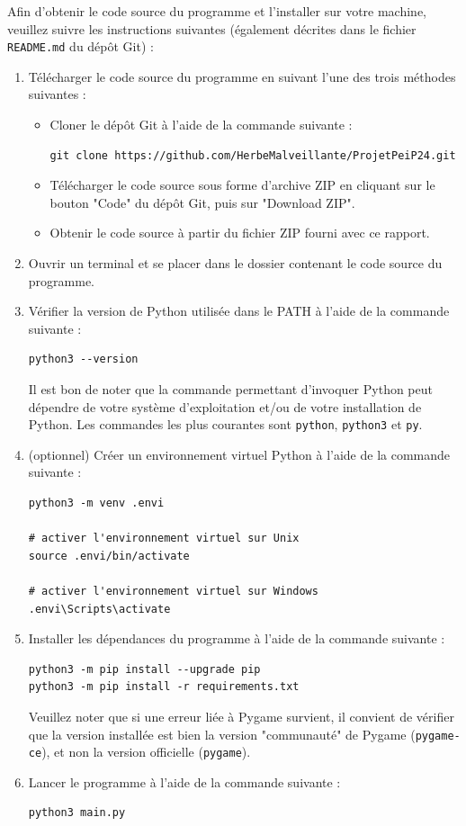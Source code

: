 \documentclass[12pt]{scrreprt} %
\begin{document}
Afin d'obtenir le code source du programme et l'installer sur votre machine, veuillez suivre les instructions suivantes (également décrites dans le fichier \texttt{README.md} du dépôt Git) :

\begin{enumerate}
    \item Télécharger le code source du programme en suivant l'une des trois méthodes suivantes :
          \begin{itemize}
              \item Cloner le dépôt Git à l'aide de la commande suivante :
                    \begin{verbatim}
git clone https://github.com/HerbeMalveillante/ProjetPeiP24.git      
              \end{verbatim}
              \item Télécharger le code source sous forme d'archive ZIP en cliquant sur le bouton "Code" du dépôt Git, puis sur "Download ZIP".
              \item Obtenir le code source à partir du fichier ZIP fourni avec ce rapport.
          \end{itemize}
    \item Ouvrir un terminal et se placer dans le dossier contenant le code source du programme.
    \item Vérifier la version de Python utilisée dans le PATH à l'aide de la commande suivante :
          \begin{verbatim}
python3 --version
    \end{verbatim}
          Il est bon de noter que la commande permettant d'invoquer Python peut dépendre de votre système d'exploitation et/ou de votre installation de Python. Les commandes les plus courantes sont \texttt{python}, \texttt{python3} et \texttt{py}.
    \item (optionnel) Créer un environnement virtuel Python à l'aide de la commande suivante :
          \begin{verbatim}
python3 -m venv .envi

# activer l'environnement virtuel sur Unix
source .envi/bin/activate

# activer l'environnement virtuel sur Windows
.envi\Scripts\activate
    \end{verbatim}
    \item Installer les dépendances du programme à l'aide de la commande suivante :
          \begin{verbatim}
python3 -m pip install --upgrade pip
python3 -m pip install -r requirements.txt
    \end{verbatim}
          Veuillez noter que si une erreur liée à Pygame survient, il convient de vérifier que la version installée est bien la version "communauté" de Pygame (\texttt{pygame-ce}), et non la version officielle (\texttt{pygame}).

    \item Lancer le programme à l'aide de la commande suivante :
          \begin{verbatim}
python3 main.py
    \end{verbatim}

\end{enumerate}
\end{document}
